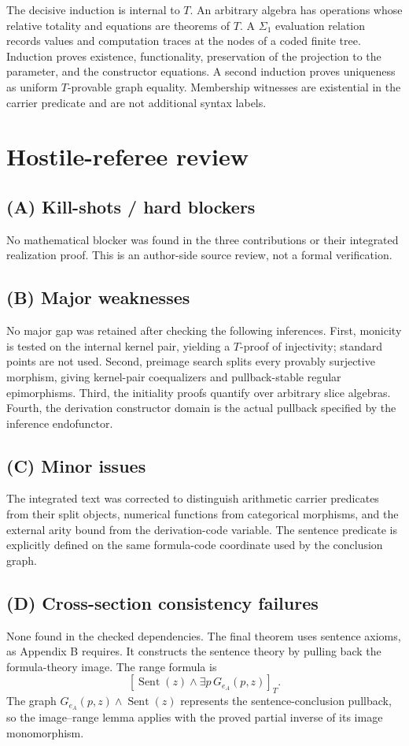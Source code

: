 \documentclass[11pt]{article}
\begin{document}
The decisive induction is internal to $T$. An arbitrary algebra has
operations whose relative totality and equations are theorems of $T$.
A $\Sigma_1$ evaluation relation records values and computation traces
at the nodes of a coded finite tree. Induction proves existence,
functionality, preservation of the projection to the parameter, and
the constructor equations. A second induction proves uniqueness as
uniform $T$-provable graph equality. Membership witnesses are existential
in the carrier predicate and are not additional syntax labels.

\section*{Hostile-referee review}
\subsection*{(A) Kill-shots / hard blockers}
No mathematical blocker was found in the three contributions or their
integrated realization proof. This is an author-side source review,
not a formal verification.

\subsection*{(B) Major weaknesses}
No major gap was retained after checking the following inferences.
First, monicity is tested on the internal kernel pair, yielding a
$T$-proof of injectivity; standard points are not used. Second,
preimage search splits every provably surjective morphism, giving
kernel-pair coequalizers and pullback-stable regular epimorphisms.
Third, the initiality proofs quantify over arbitrary slice algebras.
Fourth, the derivation constructor domain is the actual pullback
specified by the inference endofunctor.

\subsection*{(C) Minor issues}
The integrated text was corrected to distinguish arithmetic carrier
predicates from their split objects, numerical functions from categorical
morphisms, and the external arity bound from the derivation-code variable.
The sentence predicate is explicitly defined on the same formula-code
coordinate used by the conclusion graph.

\subsection*{(D) Cross-section consistency failures}
None found in the checked dependencies. The final theorem uses sentence
axioms, as Appendix B requires. It constructs the sentence theory by
pulling back the formula-theory image. The range formula is
\[
 [\operatorname{Sent}(z)\land\exists p\,G_{e_A}(p,z)]_T.
\]
The graph $G_{e_A}(p,z)\land\operatorname{Sent}(z)$ represents the
sentence-conclusion pullback, so the image--range lemma applies with
the proved partial inverse of its image monomorphism.
\end{document}
